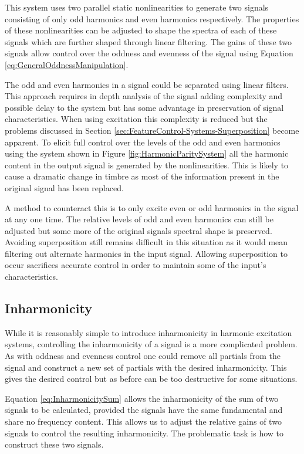 		This system uses two parallel static nonlinearities to generate two signals consisting of only odd
		harmonics and even harmonics respectively. The properties of these nonlinearities can be adjusted to shape
		the spectra of each of these signals which are further shaped through linear filtering. The gains of these
		two signals allow control over the oddness and evenness of the signal using Equation
		\ref{eq:GeneralOddnessManipulation}.

		The odd and even harmonics in a signal could be separated using linear filters. This approach requires in
		depth analysis of the signal adding complexity and possible delay to the system but has some advantage in
		preservation of signal characteristics. When using excitation this complexity is reduced but the problems
		discussed in Section \ref{sec:FeatureControl-Systems-Superposition} become apparent. To elicit full control
		over the levels of the odd and even harmonics using the system shown in Figure
		\ref{fig:HarmonicParitySystem} all the harmonic content in the output signal is generated by the
		nonlinearities. This is likely to cause a dramatic change in timbre as most of the information present in
		the original signal has been replaced. 

		A method to counteract this is to only excite even or odd harmonics in the signal at any one time. The
		relative levels of odd and even harmonics can still be adjusted but some more of the original signals
		spectral shape is preserved. Avoiding superposition still remains difficult in this situation as it would
		mean filtering out alternate harmonics in the input signal. Allowing superposition to occur sacrifices
		accurate control in order to maintain some of the input's characteristics.

	\subsection{Inharmonicity}
	\label{sec:FeatureControl-Control-Inharmonicity}
		While it is reasonably simple to introduce inharmonicity in harmonic excitation systems, controlling the
		inharmonicity of a signal is a more complicated problem. As with oddness and evenness control one could
		remove all partials from the signal and construct a new set of partials with the desired inharmonicity.
		This gives the desired control but as before can be too destructive for some situations.
		
		Equation \ref{eq:InharmonicitySum} allows the inharmonicity of the sum of two signals to be calculated,
		provided the signals have the same fundamental and share no frequency content. This allows us to adjust the
		relative gains of two signals to control the resulting inharmonicity. The problematic task is how to
		construct these two signals.

